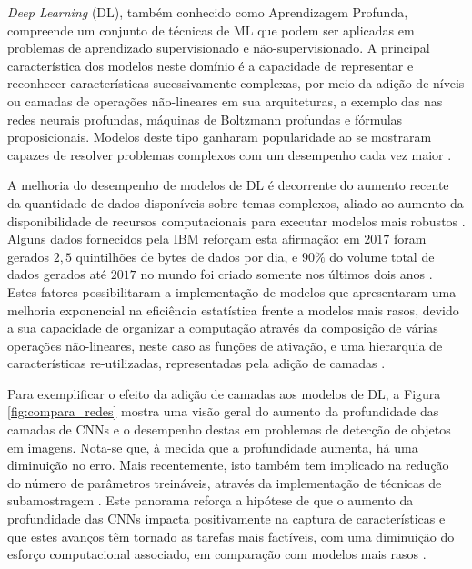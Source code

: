 
\emph{Deep Learning} (DL), também conhecido como Aprendizagem Profunda, compreende um conjunto de técnicas de ML que podem ser aplicadas em problemas de aprendizado supervisionado e não-supervisionado. A principal característica dos modelos neste domínio é a capacidade de representar e reconhecer características sucessivamente complexas, por meio da adição de níveis ou camadas de operações não-lineares em sua arquiteturas, a exemplo das nas redes neurais profundas, máquinas de Boltzmann profundas e fórmulas proposicionais. Modelos deste tipo ganharam popularidade ao se mostraram capazes de resolver problemas complexos com um desempenho cada vez maior \cite{bengio2009learning}.

A melhoria do desempenho de modelos de DL é decorrente do aumento recente da quantidade de dados disponíveis sobre temas complexos, aliado ao aumento da disponibilidade de recursos computacionais para executar modelos mais robustos \cite{goodfellow2016deep,deng2014deep}. Alguns dados fornecidos pela IBM reforçam esta afirmação: em $2017$ foram gerados $2,5$ quintilhões de bytes de dados por dia, e $90\%$ do volume total de dados gerados até $2017$ no mundo foi criado somente nos últimos dois anos \cite{ibm2017bigdata}. Estes fatores possibilitaram a implementação de modelos que apresentaram uma melhoria exponencial na eficiência estatística frente a modelos mais rasos, devido a sua capacidade de organizar a computação através da composição de várias operações não-lineares, neste caso as funções de ativação, e uma hierarquia de características re-utilizadas, representadas pela adição de camadas \cite{goodfellow2016deep}.

Para exemplificar o efeito da adição de camadas aos modelos de DL, a Figura \ref{fig:compara_redes} mostra uma visão geral do aumento da profundidade das camadas de CNNs e o desempenho destas em problemas de detecção de objetos em imagens. Nota-se que, à medida que a profundidade aumenta, há uma diminuição no erro. Mais recentemente, isto também tem implicado na redução do número de parâmetros treináveis, através da implementação de técnicas de subamostragem \cite{haykin2009neural}. Este panorama reforça a hipótese de que o aumento da profundidade das CNNs impacta positivamente na captura de características e que estes avanços têm tornado as tarefas mais factíveis, com uma diminuição do esforço computacional associado, em comparação com modelos mais rasos \cite{goodfellow2016deep}.

